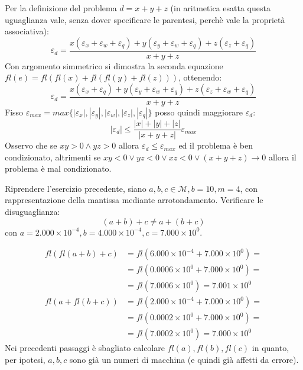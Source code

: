 Per la definizione del problema $d = x + y + z$ (in aritmetica esatta questa uguaglianza
vale, senza dover specificare le parentesi, perch\`e vale la propriet\`a associativa):
\begin{displaymath}
	\varepsilon_{d} = \frac{
			x(\varepsilon_{x} + \varepsilon_{w} + \varepsilon_{q}) + 
			y(\varepsilon_{y} + \varepsilon_{w} + \varepsilon_{q}) + 
			z(\varepsilon_{z} + \varepsilon_{q})}{x + y + z}
\end{displaymath}
Con argomento simmetrico si dimostra la seconda equazione $fl(e) = fl(fl(x) + fl(fl(y) + fl(z)))$,
ottenendo:
\begin{displaymath}
	\varepsilon_{d} = \frac{
			x(\varepsilon_{x} + \varepsilon_{q}) + 
			y(\varepsilon_{y} + \varepsilon_{w} + \varepsilon_{q}) + 
			z(\varepsilon_{z} + \varepsilon_{w} + \varepsilon_{q})}{x + y + z}
\end{displaymath}
Fisso $\varepsilon_{max} = max \lbrace |\varepsilon_{x}|, |\varepsilon_{y}|, |\varepsilon_{w}|,
|\varepsilon_{z}|, |\varepsilon_{q}|  \rbrace$
posso quindi maggiorare $\varepsilon_{d}$:
\begin{displaymath}
	|\varepsilon_{d}| \leq \frac{|x| + |y| + |z|}{|x + y + z|} \varepsilon_{max}
\end{displaymath}
Osservo che se $xy > 0 \wedge yz > 0$ allora $\varepsilon_{d} \leq \varepsilon_{max}$ ed il
problema \`e ben condizionato, altrimenti se 
$xy < 0 \vee yz < 0 \vee xz < 0 \vee (x + y + z) \rightarrow 0$ allora il problema \`e mal
condizionato.

\begin{exercise}
Riprendere l'esercizio precedente, siano $a, b, c \in \mathcal{M}, b = 10, m = 4$, con
rappresentazione della mantissa mediante arrotondamento. Verificare le disuguaglianza:
\begin{displaymath}
	(a + b) + c \not = a + (b + c)
\end{displaymath}
con $a = 2.000 \times 10^{-4}, b = 4.000 \times 10^{-4}, c = 7.000 \times 10^{0}$.
\end{exercise}
\begin{displaymath}
\begin{split}
	fl(fl(a + b) + c) &= fl(6.000 \times 10^{-4} + 7.000 \times 10^{0}) =  \\
	&= fl(0.0006 \times 10^{0} + 7.000 \times 10^{0}) = \\
	&= fl(7.0006 \times 10^{0}) = 7.001 \times 10^{0}
\end{split}
\end{displaymath}
\begin{displaymath}
\begin{split}
	fl(a + fl(b + c)) &= fl(2.000 \times 10^{-4} + 7.000 \times 10^{0}) = \\
	&= fl(0.0002 \times 10^{0} + 7.000 \times 10^{0}) = \\
  	&= fl(7.0002 \times 10^{0}) = 7.000 \times 10^{0}
\end{split}
\end{displaymath}
Nei precedenti passaggi \`e sbagliato calcolare $fl(a), fl(b), fl(c)$ in quanto, per ipotesi,
$a, b, c$ sono gi\`a un numeri di macchina (e quindi gi\`a affetti da errore).

